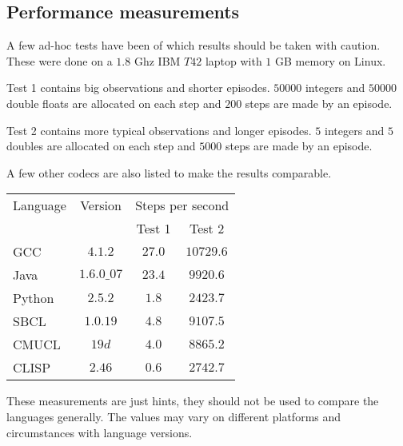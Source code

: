\documentclass[11pt,a4paper,dvipdfm]{article}
\begin{document}
\hypertarget{perfmeas}{\subsection{Performance measurements}}

A few ad-hoc tests have been of which results should be taken with caution.
These were done on a $1.8$ Ghz IBM $T42$ laptop with $1$ GB memory on Linux.

Test 1 contains big observations and shorter episodes. $50000$ integers and
$50000$ double floats are allocated on each step and $200$ steps are made by
an episode.

Test 2 contains more typical observations and longer episodes. $5$ integers
and $5$ doubles are allocated on each step and $5000$ steps are made by an
episode.

A few other codecs are also listed to make the results comparable.

\begin{center}
\begin{tabular}{|l|c|c|c|}
\hline
Language & Version & \multicolumn{2}{|c|}{Steps per second} \\
         &         & Test 1 & Test 2 \\
\hline
GCC      & $4.1.2$ & $27.0$ & $10729.6$ \\
\hline
Java     & $1.6.0\_07$ & $23.4$ & $9920.6$ \\
\hline
Python   & $2.5.2$ & $1.8$ & $2423.7$ \\
\hline
SBCL     & $1.0.19$ & $4.8$ & $9107.5$ \\
\hline
CMUCL    & $19d$ & $4.0$ & $8865.2$ \\
\hline
CLISP    & $2.46$ & $0.6$ & $2742.7$ \\
\hline
\end{tabular}
\end{center}

These measurements are just hints, they should not be used to compare the
languages generally. The values may vary on different platforms and
circumstances with language versions.
\end{document}
